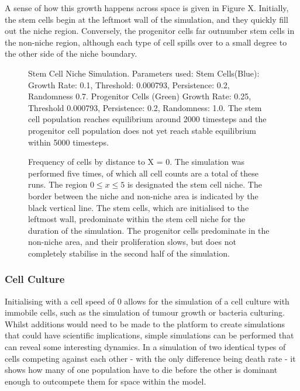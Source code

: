 \documentclass[12pt]{article}
\begin{document}
A sense of how this growth happens across space is given in Figure X. 
Initially, the stem cells begin at the leftmost wall of the simulation, 
and they quickly fill out the niche region. Conversely, the progenitor 
cells far outnumber stem cells in the non-niche region, although each 
type of cell spills over to a small degree to the other side of the 
niche boundary.

\begin{figure}[H]
\centering
\caption{Stem Cell Niche Simulation. 
Parameters used: Stem Cells(Blue): Growth Rate: 0.1, Threshold: 
0.000793, Persistence: 0.2, Randomness 0.7. Progenitor Cells (Green) 
Growth Rate: 0.25, Threshold 0.000793, Persistence: 0.2, Randomness: 
1.0. The stem cell population reaches equilibrium around 2000 timesteps 
and the progenitor cell population does not yet reach stable equilibrium 
within 5000 timesteps.}
\end{figure}

\begin{figure}[H]
\centering

\caption{Frequency of cells by distance 
to X = 0. The simulation was performed five times, of which all cell 
counts are a total of these runs. The region \(0 \leq x \leq 5\) is 
designated the stem cell niche. The border between the niche and 
non-niche area is indicated by the black vertical line. The stem cells, 
which are initialised to the leftmost wall, predominate within the stem 
cell niche for the duration of the simulation. The progenitor cells 
predominate in the non-niche area, and their proliferation slows, but 
does not completely stabilise in the second half of the simulation.}
\end{figure}

\subsubsection{Cell Culture}
Initialising with a cell speed of 0 allows for the simulation of a cell 
culture with immobile cells, such as the simulation of tumour growth or 
bacteria culturing. Whilst additions would need to be made to the 
platform to create simulations that could have scientific implications, 
simple simulations can be performed that can reveal some interesting 
dynamics. In a simulation of two identical types of cells competing 
against each other - with the only difference being death rate - it 
shows how many of one population have to die before the other is 
dominant enough to outcompete them for space within the model.
\end{document}
